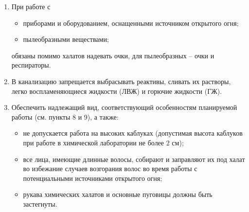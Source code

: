 \begin{enumerate}
    \item При работе с
    \begin{itemize}
        \item приборами и оборудованием, оснащенными источником открытого огня;
        \item пылеобразными веществами;
    \end{itemize}
    обязаны помимо халатов надевать очки, для пылеобразных – очки и респираторы.
    \item В канализацию запрещается выбрасывать реактивы, сливать их растворы, легко воспламеняющиеся жидкости (ЛВЖ) и горючие жидкости (ГЖ).
    \item Обеспечить надлежащий вид, соответствующий особенностям планируемой работы (см. пункты 8 и 9), а также:
    \begin{itemize}
        \item не допускается работа на высоких каблуках (допустимая высота каблуков при работе в химической лаборатории не более 2 см);
        \item все лица, имеющие длинные волосы, собирают и заправляют их под халат во избежание случаев возгорания волос во время работы с потенциальными источниками открытого огня;
        \item рукава химических халатов и основные пуговицы должны быть застегнуты.
    \end{itemize}
\end{enumerate}